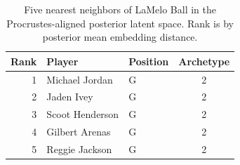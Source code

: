\begin{table}[htbp]
  \centering\small
  \begin{tabular}{rllc}
    \toprule
    Rank & Player & Position & Archetype \\
    \midrule
    1 & Michael Jordan & G & 2 \\
    2 & Jaden Ivey & G & 2 \\
    3 & Scoot Henderson & G & 2 \\
    4 & Gilbert Arenas & G & 2 \\
    5 & Reggie Jackson & G & 2 \\
    \bottomrule
  \end{tabular}
  \caption{Five nearest neighbors of LaMelo Ball in the Procrustes-aligned posterior latent space. Rank is by posterior mean embedding distance.}
  \label{tab:LaMelo_Ball_neighbors}
\end{table}

